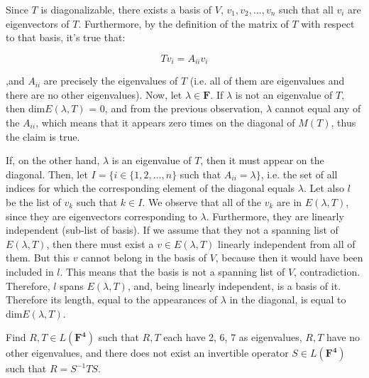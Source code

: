 \begin{solution}

Since $T$ is diagonalizable, there exists a basis of $V$, $v_1, v_2, \ldots, v_n$ such that all $v_i$ are eigenvectors of $T$. Furthermore, by the definition of the matrix of $T$ with respect to that basis, it's true that:

$$Tv_i = A_{ii}v_i$$

,and $A_{ii}$ are precisely the eigenvalues of $T$ (i.e. all of them are eigenvalues and there are no other eigenvalues). Now, let $\lambda \in \mathbf{F}$. If $\lambda$ is not an eigenvalue of $T$, then dim$E(\lambda, T)$ = 0, and from the previous observation, $\lambda$ cannot equal any of the $A_{ii}$, which means that it appears zero times on the diagonal of $M(T)$, thus the claim is true.

If, on the other hand, $\lambda$ is an eigenvalue of $T$, then it must appear on the diagonal. Then, let $I = \{i \in \{1, 2, \ldots, n\}$ such that $A_{ii} = \lambda\}$, i.e. the set of all indices for which the corresponding element of the diagonal equals $\lambda$. Let also $l$ be the list of $v_k$ such that $k \in I$. We observe that all of the $v_k$ are in $E(\lambda, T)$, since they are eigenvectors corresponding to $\lambda$. Furthermore, they are linearly independent (sub-list of basis). If we assume that they not a spanning list of $E(\lambda, T)$, then there must exist a $v \in E(\lambda, T)$ linearly independent from all of them. But this $v$ cannot belong in the basis of $V$, because then it would have been included in $l$. This means that the basis is not a spanning list of $V$, contradiction. Therefore, $l$ spans $E(\lambda, T)$, and, being linearly independent, is a basis of it. Therefore its length, equal to the appearances of $\lambda$ in the diagonal, is equal to dim$E(\lambda, T)$.
\end{solution}

\begin{exercise}{13}
Find $R, T \in L(\mathbf{F^4})$ such that $R, T$ each have 2, 6, 7 as eigenvalues, $R, T$ have no other eigenvalues, and there does not exist an invertible operator $S \in L(\mathbf{F^4})$ such that $R = S^{-1}TS$.
\end{exercise}

